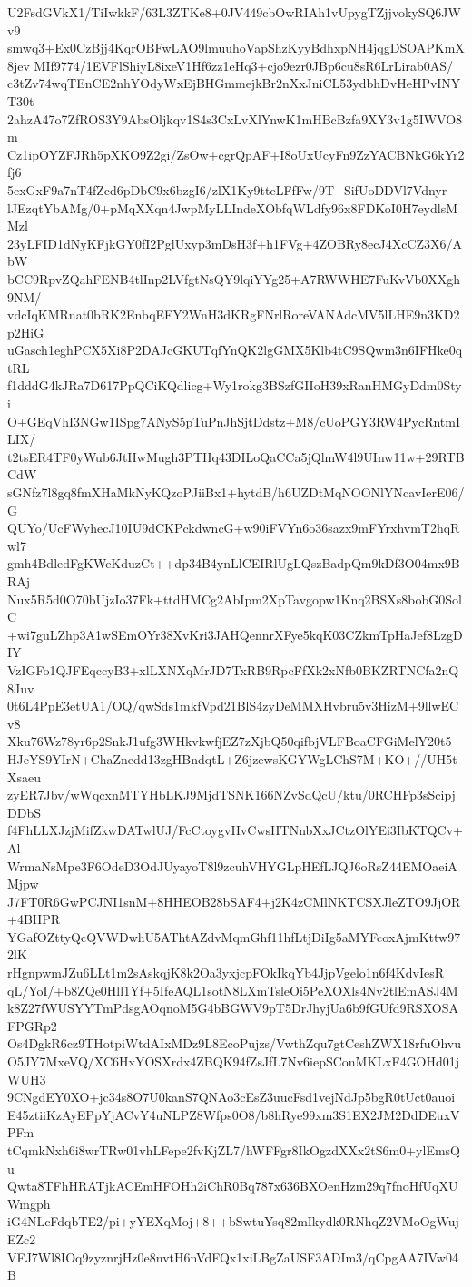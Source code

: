 U2FsdGVkX1/TiIwkkF/63L3ZTKe8+0JV449cbOwRIAh1vUpygTZjjvokySQ6JWv9
smwq3+Ex0CzBjj4KqrOBFwLAO9lmuuhoVapShzKyyBdhxpNH4jqgDSOAPKmX8jev
MIf9774/1EVFlShiyL8ixeV1Hf6zz1eHq3+cjo9ezr0JBp6cu8sR6LrLirab0AS/
c3tZv74wqTEnCE2nhYOdyWxEjBHGmmejkBr2nXxJniCL53ydbhDvHeHPvINYT30t
2ahzA47o7ZfROS3Y9AbsOljkqv1S4s3CxLvXlYnwK1mHBcBzfa9XY3v1g5IWVO8m
Cz1ipOYZFJRh5pXKO9Z2gi/ZsOw+cgrQpAF+I8oUxUcyFn9ZzYACBNkG6kYr2fj6
5exGxF9a7nT4fZcd6pDbC9x6bzgI6/zlX1Ky9tteLFfFw/9T+SifUoDDVl7Vdnyr
lJEzqtYbAMg/0+pMqXXqn4JwpMyLLIndeXObfqWLdfy96x8FDKoI0H7eydlsMMzl
23yLFID1dNyKFjkGY0fI2PglUxyp3mDsH3f+h1FVg+4ZOBRy8ecJ4XcCZ3X6/AbW
bCC9RpvZQahFENB4tlInp2LVfgtNsQY9lqiYYg25+A7RWWHE7FuKvVb0XXgh9NM/
vdcIqKMRnat0bRK2EnbqEFY2WnH3dKRgFNrlRoreVANAdcMV5lLHE9n3KD2p2HiG
uGasch1eghPCX5Xi8P2DAJcGKUTqfYnQK2lgGMX5Klb4tC9SQwm3n6IFHke0qtRL
f1dddG4kJRa7D617PpQCiKQdlicg+Wy1rokg3BSzfGIIoH39xRanHMGyDdm0Styi
O+GEqVhI3NGw1ISpg7ANyS5pTuPnJhSjtDdstz+M8/cUoPGY3RW4PycRntmILIX/
t2tsER4TF0yWub6JtHwMugh3PTHq43DILoQaCCa5jQlmW4l9UInw11w+29RTBCdW
sGNfz7l8gq8fmXHaMkNyKQzoPJiiBx1+hytdB/h6UZDtMqNOONlYNcavIerE06/G
QUYo/UcFWyhecJ10IU9dCKPckdwncG+w90iFVYn6o36sazx9mFYrxhvmT2hqRwl7
gmh4BdledFgKWeKduzCt++dp34B4ynLlCEIRlUgLQszBadpQm9kDf3O04mx9BRAj
Nux5R5d0O70bUjzIo37Fk+ttdHMCg2AbIpm2XpTavgopw1Knq2BSXs8bobG0SolC
+wi7guLZhp3A1wSEmOYr38XvKri3JAHQennrXFye5kqK03CZkmTpHaJef8LzgDIY
VzIGFo1QJFEqccyB3+xlLXNXqMrJD7TxRB9RpcFfXk2xNfb0BKZRTNCfa2nQ8Juv
0t6L4PpE3etUA1/OQ/qwSds1mkfVpd21BlS4zyDeMMXHvbru5v3HizM+9llwECv8
Xku76Wz78yr6p2SnkJ1ufg3WHkvkwfjEZ7zXjbQ50qifbjVLFBoaCFGiMelY20t5
HJcYS9YIrN+ChaZnedd13zgHBndqtL+Z6jzewsKGYWgLChS7M+KO+//UH5tXsaeu
zyER7Jbv/wWqcxnMTYHbLKJ9MjdTSNK166NZvSdQcU/ktu/0RCHFp3sScipjDDbS
f4FhLLXJzjMifZkwDATwlUJ/FcCtoygvHvCwsHTNnbXxJCtzOlYEi3IbKTQCv+Al
WrmaNsMpe3F6OdeD3OdJUyayoT8l9zcuhVHYGLpHEfLJQJ6oRsZ44EMOaeiAMjpw
J7FT0R6GwPCJNI1snM+8HHEOB28bSAF4+j2K4zCMlNKTCSXJleZTO9JjOR+4BHPR
YGafOZttyQcQVWDwhU5AThtAZdvMqmGhf11hfLtjDiIg5aMYFcoxAjmKttw972lK
rHgnpwmJZu6LLt1m2sAskqjK8k2Oa3yxjcpFOkIkqYb4JjpVgelo1n6f4KdvIesR
qL/YoI/+b8ZQe0Hll1Yf+5IfeAQL1sotN8LXmTsleOi5PeXOXls4Nv2tlEmASJ4M
k8Z27fWUSYYTmPdsgAOqnoM5G4bBGWV9pT5DrJhyjUa6b9fGUfd9RSXOSAFPGRp2
Os4DgkR6cz9THotpiWtdAIxMDz9L8EcoPujzs/VwthZqu7gtCeshZWX18rfuOhvu
O5JY7MxeVQ/XC6HxYOSXrdx4ZBQK94fZsJfL7Nv6iepSConMKLxF4GOHd01jWUH3
9CNgdEY0XO+jc34s8O7U0kanS7QNAo3cEsZ3uucFsd1vejNdJp5bgR0tUct0auoi
E45ztiiKzAyEPpYjACvY4uNLPZ8Wfps0O8/b8hRye99xm3S1EX2JM2DdDEuxVPFm
tCqmkNxh6i8wrTRw01vhLFepe2fvKjZL7/hWFFgr8IkOgzdXXx2tS6m0+ylEmsQu
Qwta8TFhHRATjkACEmHFOHh2iChR0Bq787x636BXOenHzm29q7fnoHfUqXUWmgph
iG4NLcFdqbTE2/pi+yYEXqMoj+8++bSwtuYsq82mIkydk0RNhqZ2VMoOgWujEZc2
VFJ7Wl8IOq9zyznrjHz0e8nvtH6nVdFQx1xiLBgZaUSF3ADIm3/qCpgAA7IVw04B
